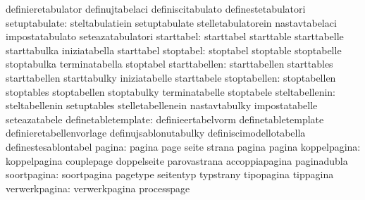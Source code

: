                                  definieretabulator               definujtabelaci
                                  definiscitabulato                definestetabulatori
                   setuptabulate: steltabulatiein                  setuptabulate
                                  stelletabulatorein               nastavtabelaci
                                  impostatabulato                  seteazatabulatori
                      starttabel: starttabel                       starttable
                                  starttabelle                     starttabulka
                                  iniziatabella                    starttabel
                       stoptabel: stoptabel                        stoptable
                                  stoptabelle                      stoptabulka
                                  terminatabella                   stoptabel
                   starttabellen: starttabellen                    starttables
                                  starttabellen                    starttabulky
                                  iniziatabelle                    starttabele
                    stoptabellen: stoptabellen                     stoptables
                                  stoptabellen                     stoptabulky
                                  terminatabelle                   stoptabele
                  steltabellenin: steltabellenin                   setuptables
                                  stelletabellenein                nastavtabulky
                                  impostatabelle                   seteazatabele
             definetabletemplate: definieertabelvorm               definetabletemplate
                                  definieretabellenvorlage         definujsablonutabulky
                                  definiscimodellotabella          definestesablontabel
                          pagina: pagina                           page
                                  seite                            strana
                                  pagina                           pagina
                    koppelpagina: koppelpagina                     couplepage
                                  doppelseite                      parovastrana
                                  accoppiapagina                   paginadubla
                     soortpagina: soortpagina                      pagetype
                                  seitentyp                        typstrany
                                  tipopagina                       tippagina
                   verwerkpagina: verwerkpagina                    processpage
